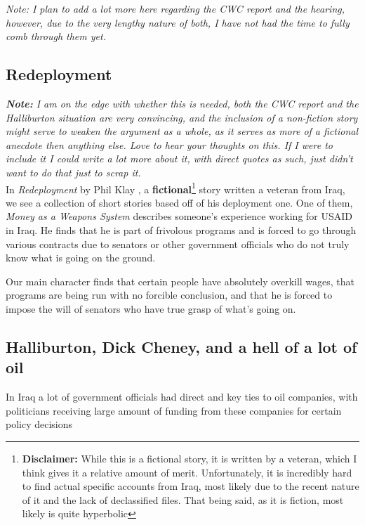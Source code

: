 \documentclass{article}
\begin{document}
        \textit{Note: I plan to add a lot more here regarding the CWC report and the hearing, however, due to the very lengthy nature of both, I have not had the time to fully comb through them yet. }

    \subsection{Redeployment}
        \begingroup     
            \centering
            \textit{\textbf{Note:} I am on the edge with whether this is needed, both the CWC report and the Halliburton situation are very convincing, and the inclusion of a non-fiction story might serve to weaken the argument as a whole, as it serves as more of a fictional anecdote then anything else. Love to hear your thoughts on this. If I were to include it I could write a lot more about it, with direct quotes as such, just didn't want to do that just to scrap it. }
        \endgroup\\[15pt]
        In \textit{Redeployment} by Phil Klay \cite{Klay2014}, a \textbf{fictional}\footnote{\textbf{Disclaimer:} While this is a fictional story, it is written by a veteran, which I think gives it a relative amount of merit. Unfortunately, it is incredibly hard to find actual specific accounts from Iraq, most likely due to the recent nature of it and the lack of declassified files. That being said, as it is fiction, most likely is quite hyperbolic} story written a veteran from Iraq, we see a collection of short stories based off of his deployment one. One of them, \textit{Money as a Weapons System} describes someone's experience working for USAID in Iraq. He finds that he is part of frivolous programs and is forced to  go through various contracts due to senators or other government officials who do not truly know what is going on the ground. 

        Our main character finds that certain people have absolutely overkill wages, that programs are being run with no forcible conclusion, and that he is forced to impose the will of senators who have true grasp of what's going on. 

    \subsection{Halliburton, Dick Cheney, and a hell of a lot of oil}
        In Iraq a lot of government officials had direct and key ties to oil companies, with politicians receiving large amount of funding from these companies for certain policy decisions
\end{document}
